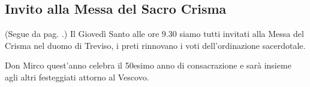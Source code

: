 \clearpage
\subsection{Invito alla Messa del Sacro Crisma}
\label{sacro-crisma}

(Segue da pag. \pageref{celebrazioni}.) Il Giovedì Santo alle ore 9.30 siamo tutti invitati alla Messa del Crisma nel duomo di Treviso, i preti rinnovano i voti dell'ordinazione sacerdotale.

Don Mirco quest'anno celebra il 50esimo anno di consacrazione e sarà insieme agli altri festeggiati attorno al Vescovo.
